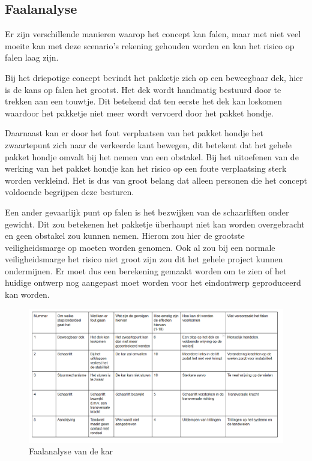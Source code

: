  
\subsection{Faalanalyse}
\label{se:Faalanalyse}
Er zijn verschillende manieren waarop het concept kan falen, maar met niet veel moeite kan met deze scenario's rekening gehouden worden en kan het risico op falen laag zijn.

Bij het driepotige concept bevindt het pakketje zich op een beweegbaar dek, hier is de kans op falen het grootst. Het dek wordt handmatig bestuurd door te trekken aan een touwtje. Dit betekend dat ten eerste het dek kan loskomen waardoor het pakketje niet meer wordt vervoerd door het pakket hondje.

Daarnaast kan er door het fout verplaatsen van het pakket hondje het zwaartepunt zich naar de verkeerde kant bewegen, dit betekent dat het gehele pakket hondje omvalt bij het nemen van een obstakel. Bij het uitoefenen van de werking van het pakket hondje kan het risico op een foute verplaatsing sterk worden verkleind. Het is dus van groot belang dat alleen personen die het concept voldoende begrijpen deze besturen.

Een ander gevaarlijk punt op falen is het bezwijken van de schaarliften onder gewicht. Dit zou betekenen het pakketje überhaupt niet kan worden overgebracht en geen obstakel zou kunnen nemen. Hierom zou hier de grootste veiligheidsmarge op moeten worden genomen. Ook al zou bij een normale veiligheidsmarge het risico niet groot zijn zou dit het gehele project kunnen ondermijnen. Er moet dus een berekening gemaakt worden om te zien of het huidige ontwerp nog aangepast moet worden voor het eindontwerp geproduceerd kan worden.
\begin{figure}[H]
    \centering
    \includegraphics[width = 150mm]{04_gekozenconcept/Tabel_faal.PNG}
    \caption{Faalanalyse van de kar}
    \label{fig:tabel_faal}
\end{figure}


